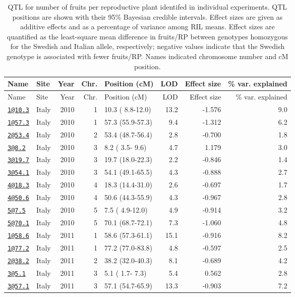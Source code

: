 \documentclass[
]{article}
\begin{document}
\begin{longtable}[]{@{}llrrlrrr@{}}
\caption{\label{tab:individual-frut-qtl}QTL for number of fruits per reproductive plant identifed in individual experiments. QTL positions are shown with their 95\% Bayesian credible intervals. Effect sizes are given as additive effects and as a percentage of variance among RIL means. Effect sizes are quantified as the least-square mean difference in fruits/RP between genotypes homozygous for the Swedish and Italian allele, respectively; negative values indicate that the Swedish genotype is associated with fewer fruits/RP. Names indicated chromosome number and cM position.}\tabularnewline
\toprule
Name & Site & Year & Chr. & Position (cM) & LOD & Effect size & \% var. explained\tabularnewline
\midrule
\endfirsthead
\toprule
Name & Site & Year & Chr. & Position (cM) & LOD & Effect size & \% var. explained\tabularnewline
\midrule
\endhead
\href{mailto:1@10.3}{\nolinkurl{1@10.3}} & Italy & 2010 & 1 & 10.3 ( 8.8-12.0) & 13.2 & -1.576 & 9.0\tabularnewline
\href{mailto:1@57.3}{\nolinkurl{1@57.3}} & Italy & 2010 & 1 & 57.3 (55.9-57.3) & 9.4 & -1.312 & 6.2\tabularnewline
\href{mailto:2@53.4}{\nolinkurl{2@53.4}} & Italy & 2010 & 2 & 53.4 (48.7-56.4) & 2.8 & -0.700 & 1.8\tabularnewline
\href{mailto:3@8.2}{\nolinkurl{3@8.2}} & Italy & 2010 & 3 & 8.2 ( 3.5- 9.6) & 4.7 & 1.179 & 3.0\tabularnewline
\href{mailto:3@19.7}{\nolinkurl{3@19.7}} & Italy & 2010 & 3 & 19.7 (18.0-22.3) & 2.2 & -0.846 & 1.4\tabularnewline
\href{mailto:3@54.1}{\nolinkurl{3@54.1}} & Italy & 2010 & 3 & 54.1 (49.1-65.5) & 4.3 & -0.888 & 2.7\tabularnewline
\href{mailto:4@18.3}{\nolinkurl{4@18.3}} & Italy & 2010 & 4 & 18.3 (14.4-31.0) & 2.6 & -0.697 & 1.7\tabularnewline
\href{mailto:4@50.6}{\nolinkurl{4@50.6}} & Italy & 2010 & 4 & 50.6 (44.3-55.9) & 4.3 & -0.967 & 2.8\tabularnewline
\href{mailto:5@7.5}{\nolinkurl{5@7.5}} & Italy & 2010 & 5 & 7.5 ( 4.9-12.0) & 4.9 & -0.914 & 3.2\tabularnewline
\href{mailto:5@70.1}{\nolinkurl{5@70.1}} & Italy & 2010 & 5 & 70.1 (68.7-72.1) & 7.3 & -1.060 & 4.8\tabularnewline
\href{mailto:1@58.6}{\nolinkurl{1@58.6}} & Italy & 2011 & 1 & 58.6 (57.3-61.1) & 15.1 & -0.916 & 8.2\tabularnewline
\href{mailto:1@77.2}{\nolinkurl{1@77.2}} & Italy & 2011 & 1 & 77.2 (77.0-83.8) & 4.8 & -0.597 & 2.5\tabularnewline
\href{mailto:2@38.2}{\nolinkurl{2@38.2}} & Italy & 2011 & 2 & 38.2 (32.0-40.3) & 8.1 & -0.689 & 4.2\tabularnewline
\href{mailto:3@5.1}{\nolinkurl{3@5.1}} & Italy & 2011 & 3 & 5.1 ( 1.7- 7.3) & 5.4 & 0.562 & 2.8\tabularnewline
\href{mailto:3@57.1}{\nolinkurl{3@57.1}} & Italy & 2011 & 3 & 57.1 (54.7-65.9) & 13.3 & -0.903 & 7.2\tabularnewline

\end{longtable}
\end{document}
